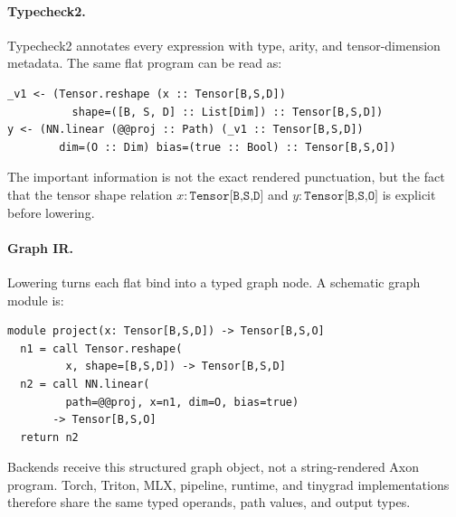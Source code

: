 \documentclass{article}
\newcommand{\code}[1]{\texttt{#1}}
\begin{document}
\paragraph{Typecheck2.}
Typecheck2 annotates every expression with type, arity, and tensor-dimension
metadata.  The same flat program can be read as:
\begin{verbatim}
_v1 <- (Tensor.reshape (x :: Tensor[B,S,D])
          shape=([B, S, D] :: List[Dim]) :: Tensor[B,S,D])
y <- (NN.linear (@@proj :: Path) (_v1 :: Tensor[B,S,D])
        dim=(O :: Dim) bias=(true :: Bool) :: Tensor[B,S,O])
\end{verbatim}
The important information is not the exact rendered punctuation, but the fact
that the tensor shape relation \(x : \code{Tensor[B,S,D]}\) and
\(y : \code{Tensor[B,S,O]}\) is explicit before lowering.

\paragraph{Graph IR.}
Lowering turns each flat bind into a typed graph node.  A schematic graph
module is:
\begin{verbatim}
module project(x: Tensor[B,S,D]) -> Tensor[B,S,O]
  n1 = call Tensor.reshape(
         x, shape=[B,S,D]) -> Tensor[B,S,D]
  n2 = call NN.linear(
         path=@@proj, x=n1, dim=O, bias=true)
       -> Tensor[B,S,O]
  return n2
\end{verbatim}
Backends receive this structured graph object, not a string-rendered Axon
program.  Torch, Triton, MLX, pipeline, runtime, and tinygrad implementations
therefore share the same typed operands, path values, and output types.
\end{document}
